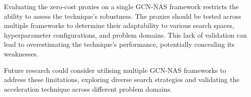 Evaluating the zero-cost proxies on a single \gls{GCN}-\gls{NAS} framework restricts the ability to assess the technique's robustness. The proxies should be tested across multiple frameworks to determine their adaptability to various search spaces, hyperparameter configurations, and problem domains. This lack of validation can lead to overestimating the technique's performance, potentially concealing its weaknesses.

Future research could consider utilising multiple \gls{GCN}-\gls{NAS} frameworks to address these limitations, exploring diverse search strategies and validating the acceleration technique across different problem domains. 
